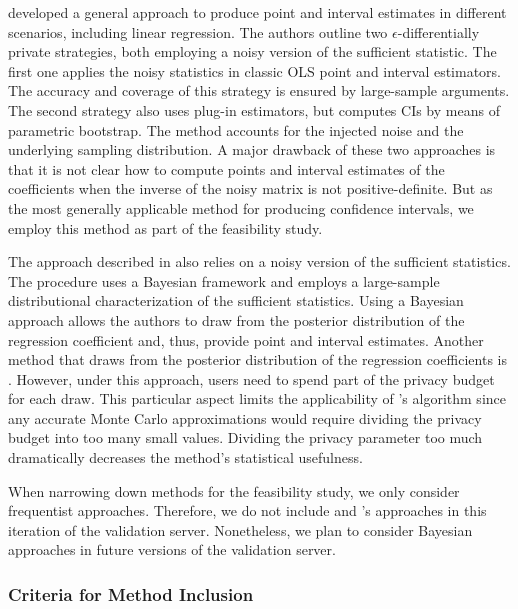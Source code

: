 \citet{ferrando2020general} developed a general approach to produce point and interval estimates in different scenarios, including linear regression. The authors outline two $\epsilon$-differentially private strategies, both employing a noisy version of the sufficient statistic. The first one applies the noisy statistics in classic OLS point and interval estimators. The accuracy and coverage of this strategy is ensured by large-sample arguments. The second strategy also uses plug-in estimators, but computes CIs by means of parametric bootstrap. The method accounts for the injected noise and the underlying sampling distribution. A major drawback of these two approaches is that it is not clear how to compute points and interval estimates of the coefficients when the inverse of the noisy matrix is not positive-definite. But as the most generally applicable method for producing confidence intervals, we employ this method as part of the feasibility study.

The approach described in \citet{bernstein2019differentially} also relies on a noisy version of the sufficient statistics. The procedure uses a Bayesian framework and employs a large-sample distributional characterization of the sufficient statistics. Using a Bayesian approach allows the authors to draw from the posterior distribution of the regression coefficient and, thus, provide point and interval estimates. Another method that draws from the posterior distribution of the regression coefficients is \citet{wang2018revisiting}. However, under this approach, users need to spend part of the privacy budget for each draw. This particular aspect limits the applicability of \citet{wang2018revisiting}'s algorithm since any accurate Monte Carlo approximations would require dividing the privacy budget into too many small values. Dividing the privacy parameter too much dramatically decreases the method's statistical usefulness.

When narrowing down methods for the feasibility study, we only consider frequentist approaches. Therefore, we do not include \citet{bernstein2019differentially} and \citet{wang2018revisiting}'s approaches in this iteration of the validation server. Nonetheless, we plan to consider Bayesian approaches in future versions of the validation server.

\subsubsection{Criteria for Method Inclusion}

